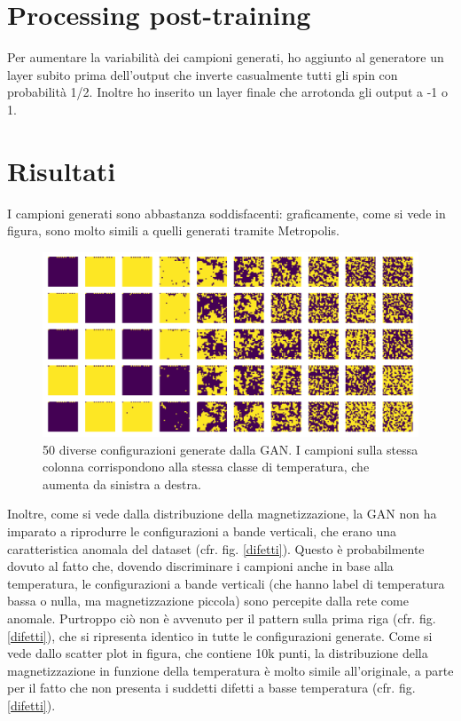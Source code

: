 \documentclass[Lau, noexaminfo, oneside]{sapthesis} %
\begin{document}
\section{Processing post-training}
Per aumentare la variabilità dei campioni generati, ho aggiunto al generatore un layer subito prima dell'output che inverte casualmente tutti gli spin con probabilità 1/2. Inoltre ho inserito un layer finale che arrotonda gli output a -1 o 1.
\section{Risultati}
I campioni generati sono abbastanza soddisfacenti: graficamente, come si vede in figura, sono molto simili a quelli generati tramite Metropolis. 
\begin{figure}[H]
\includegraphics[width=\textwidth]{fig1.png}
\centering
\caption{50 diverse configurazioni generate dalla GAN. I campioni sulla stessa colonna corrispondono alla stessa classe di temperatura, che aumenta da sinistra a destra.}
\end{figure}
Inoltre, come si vede dalla distribuzione della magnetizzazione, la GAN non ha imparato a riprodurre le configurazioni a bande verticali, che erano una caratteristica anomala del dataset (cfr. fig. \ref{difetti}). Questo è probabilmente dovuto al fatto che, dovendo discriminare i campioni anche in base alla temperatura, le configurazioni a bande verticali (che hanno label di temperatura bassa o nulla, ma magnetizzazione piccola) sono percepite dalla rete come anomale. Purtroppo ciò non è avvenuto per il pattern sulla prima riga (cfr. fig. \ref{difetti}), che si ripresenta identico in tutte le configurazioni generate.
Come si vede dallo scatter plot in figura, che contiene 10k punti, la distribuzione della magnetizzazione in funzione della temperatura è molto simile all'originale, a parte per il fatto che non presenta i suddetti difetti a basse temperatura (cfr. fig. \ref{difetti}).
\end{document}
